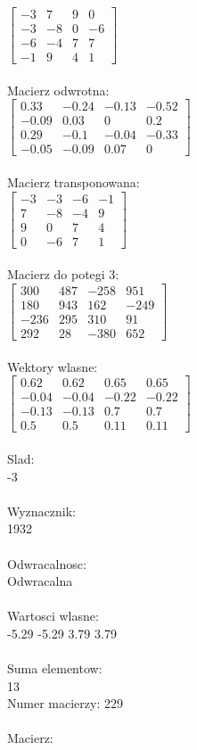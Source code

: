 \documentclass[a4paper,12pt]{article}
\begin{document}
$\begin{bmatrix} -3&7&9&0\\-3&-8&0&-6\\-6&-4&7&7\\-1&9&4&1 \end{bmatrix}$
\\
\\
Macierz odwrotna:\\

$\begin{bmatrix} 0.33&-0.24&-0.13&-0.52\\-0.09&0.03&0&0.2\\0.29&-0.1&-0.04&-0.33\\-0.05&-0.09&0.07&0 \end{bmatrix}$
\\
\\
Macierz transponowana:\\

$\begin{bmatrix} -3&-3&-6&-1\\7&-8&-4&9\\9&0&7&4\\0&-6&7&1 \end{bmatrix}$
\\
\\
Macierz do potegi 3:\\

$\begin{bmatrix} 300&487&-258&951\\180&943&162&-249\\-236&295&310&91\\292&28&-380&652 \end{bmatrix}$
\\
\\
Wektory wlasne:\\

$\begin{bmatrix} 0.62&0.62&0.65&0.65\\-0.04&-0.04&-0.22&-0.22\\-0.13&-0.13&0.7&0.7\\0.5&0.5&0.11&0.11 \end{bmatrix}$
\\
\\
Slad:\\
-3
\\
\\
Wyznacznik:\\
1932
\\
\\
Odwracalnosc:\\
Odwracalna
\\
\\
Wartosci wlasne:\\
-5.29 -5.29 3.79 3.79
\\
\\
Suma elementow:\\
13
\\
\newpage
Numer macierzy:
229
\\
\\
Macierz:\\
\end{document}
